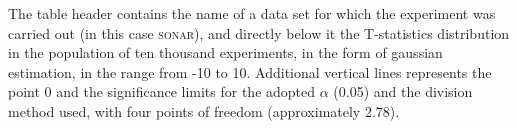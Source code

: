 \documentclass[12pt,a4paper]{report}
\begin{document}
\begin{table}[!h]
	\centering
	\caption{Example}
	\label{tab:example}
\end{table}

The table header contains the name of a data set for which the experiment was carried out (in this case \textsc{sonar}), and directly below it the T-statistics distribution in the population of ten thousand experiments, in the form of gaussian estimation, in the range from -10 to 10. Additional vertical lines represents the point 0 and the significance limits for the adopted $\alpha$ (0.05) and the division method used, with four points of freedom (approximately 2.78).

\end{document}
